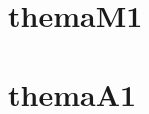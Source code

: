 \documentclass[nocrop]{sesamanuel}
\begin{document}

\themaM
\chapter{themaM1}

\themaA
\chapter{themaA1}


%
%
\end{document}
